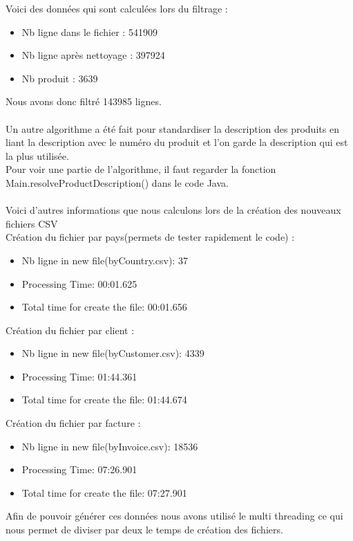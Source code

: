 \documentclass[a4paper]{article}
\begin{document}
Voici des données qui sont calculées lors du filtrage :
\begin{itemize}  
\item Nb ligne dans le fichier : 541909
\item Nb ligne après nettoyage : 397924
\item Nb produit : 3639
\end{itemize}
\vspace{6pt}
Nous avons donc filtré 143985 lignes.
\\\\
Un autre algorithme a été fait pour standardiser la description des produits en liant la description avec le numéro du produit et l'on garde la description qui est la plus utilisée.
\\ 
Pour voir une partie de l'algorithme, il faut regarder la fonction Main.resolveProductDescription() dans le code Java.
\\\\
Voici d'autres informations que nous calculons lors de la création des nouveaux fichiers CSV
\\
Création du fichier par pays(permets de tester rapidement le code) :
\begin{itemize}  
\item Nb ligne in new file(byCountry.csv): 37
\item Processing Time: 00:01.625
\item Total time for create the file: 00:01.656
\end{itemize}
\vspace{6pt}
Création du fichier par client :
\begin{itemize}  
\item Nb ligne in new file(byCustomer.csv): 4339
\item Processing Time: 01:44.361
\item Total time for create the file: 01:44.674 
\end{itemize}
\vspace{6pt}
Création du fichier par facture :
\begin{itemize}  
\item Nb ligne in new file(byInvoice.csv): 18536
\item Processing Time: 07:26.901
\item Total time for create the file: 07:27.901
\end{itemize}
\vspace{6pt}
Afin de pouvoir générer ces données nous avons utilisé le multi threading ce qui nous permet de diviser par deux le temps de création des fichiers.
\end{document}
